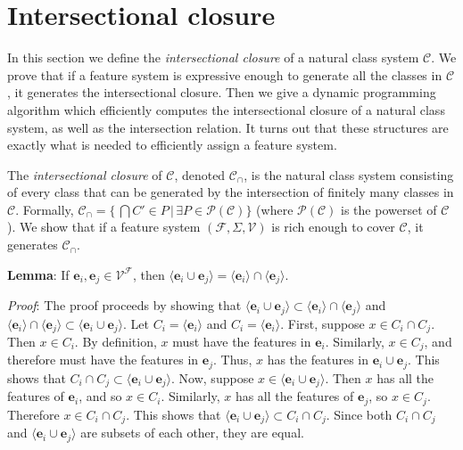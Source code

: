 \documentclass[11pt, oneside]{article}   	%
\begin{document}
\section{Intersectional closure}

In this section we define the \textit{intersectional closure} of a natural class system $\mathcal C$. We prove that if a feature system is expressive enough to generate all the classes in $\mathcal C$, it generates the intersectional closure. Then we give a dynamic programming algorithm which efficiently computes the intersectional closure of a natural class system, as well as the intersection relation. It turns out that these structures are exactly what is needed to efficiently assign a feature system.

\vspace{\baselineskip} The \textit{intersectional closure} of $\mathcal C$, denoted $\mathcal C_\cap$, is the natural class system consisting of every class that can be generated by the intersection of finitely many classes in $\mathcal C$. Formally, $\mathcal C_\cap = \{\, \bigcap {C' \in P}  \, | \, \exists P \in \mathcal P(\mathcal C) \}$ (where $\mathcal P(\mathcal C)$ is the powerset of $\mathcal C$). We show that if a feature system $(\mathcal F, \Sigma, \mathcal V)$ is rich enough to cover $\mathcal C$, it generates $\mathcal C_\cap$.

\vspace{\baselineskip} \noindent \textbf{Lemma}: If $\mathbf{e}_i, \mathbf{e}_j \in \mathcal V^\mathcal F$, then $\langle \mathbf{e}_i \cup \mathbf{e}_j \rangle =  \langle \mathbf{e}_i \rangle \cap \langle \mathbf{e}_j \rangle$.

\textit{Proof}: The proof proceeds by showing that $\langle \mathbf{e}_i \cup \mathbf{e}_j \rangle \subset  \langle \mathbf{e}_i \rangle \cap \langle \mathbf{e}_j \rangle$ and $ \langle \mathbf{e}_i \rangle \cap \langle \mathbf{e}_j \rangle \subset \langle \mathbf{e}_i \cup \mathbf{e}_j \rangle$.
Let $C_i = \langle \mathbf{e}_i \rangle$ and $C_i = \langle \mathbf{e}_i \rangle$.
First, suppose $x \in C_i \cap C_j$. Then $x \in C_i$. By definition, $x$ must have the features in $\mathbf{e}_i$.
Similarly, $x \in C_j$, and therefore must have the features in $\mathbf{e}_j$.
Thus, $x$ has the features in $\mathbf{e}_i \cup \mathbf{e}_j$. This shows that $C_i \cap C_j \subset \langle \mathbf{e}_i \cup \mathbf{e}_j \rangle$.
Now, suppose $x \in \langle \mathbf{e}_i \cup \mathbf{e}_j \rangle$. Then $x$ has all the features of $\mathbf{e}_i$, and so $x \in C_i$.
Similarly, $x$ has all the features of $\mathbf{e}_j$, so $x \in C_j$. Therefore $x \in C_i \cap C_j$. This shows that $\langle \mathbf{e}_i \cup \mathbf{e}_j \rangle \subset C_i \cap C_j$.
Since both $C_i \cap C_j$ and $\langle \mathbf{e}_i \cup \mathbf{e}_j \rangle$ are subsets of each other, they are equal.
\end{document}

